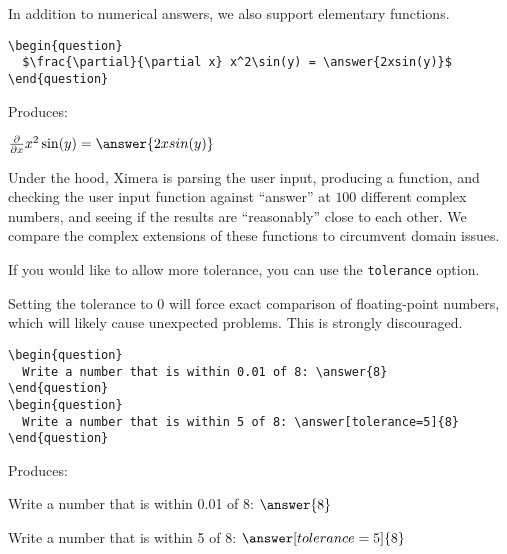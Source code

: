 \documentclass{ximera}
\begin{document}
\begin{example}
In addition to numerical answers, we also support elementary functions.

\begin{verbatim}
\begin{question}
  $\frac{\partial}{\partial x} x^2\sin(y) = \answer{2xsin(y)}$
\end{question}
\end{verbatim}

Produces:

\begin{question}
  $\frac{\partial}{\partial x} x^2\sin(y) = \answer{2xsin(y)}$
\end{question}


\begin{remark}
Under the hood, Ximera is parsing the user input, producing a
function, and checking the user input function against ``answer'' at
$100$ different complex numbers, and seeing if the results are
``reasonably'' close to each other.  We compare the complex extensions
of these functions to circumvent domain issues.
\end{remark}
\end{example}


\begin{example} If you would like to allow more tolerance, you can use the \verb!tolerance! option. 

\begin{warning}
Setting the tolerance to 0 will force exact comparison of floating-point numbers, which will likely cause unexpected problems. This is strongly discouraged. 
\end{warning}

\begin{verbatim}
\begin{question}
  Write a number that is within 0.01 of 8: \answer{8}
\end{question}
\begin{question}
  Write a number that is within 5 of 8: \answer[tolerance=5]{8}
\end{question}
\end{verbatim}

Produces:

\begin{question}
  Write a number that is within 0.01 of 8: $\answer{8}$
\end{question}
\begin{question}
  Write a number that is within 5 of 8: $\answer[tolerance=5]{8}$
\end{question}
\end{example}
\end{document}
